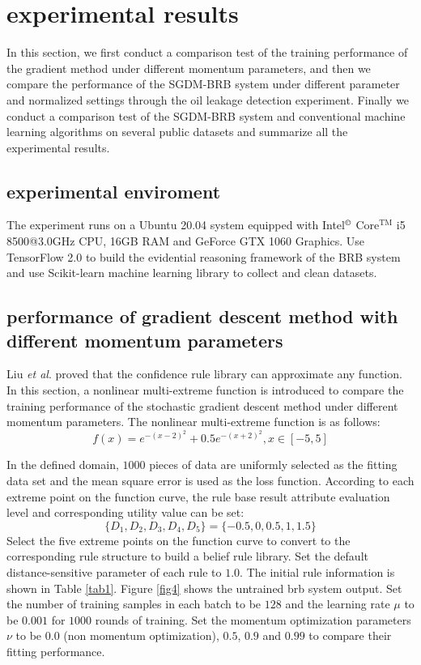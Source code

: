 \documentclass{ieeeaccess}
\begin{document}
\section{experimental results}
In this section, we first conduct a comparison test of the training performance of the gradient method under different momentum parameters,
and then we compare the performance of the SGDM-BRB system under different parameter and normalized settings through the oil leakage detection experiment.
Finally we conduct a comparison test of the SGDM-BRB system and conventional machine learning algorithms on several public datasets and summarize all the experimental results.

\subsection{experimental enviroment}
The experiment runs on a Ubuntu 20.04 system equipped with Intel$^{\copyright}$ Core$^{\text{TM}}$ i5 8500@3.0GHz CPU, 16GB RAM and GeForce GTX 1060 Graphics.
Use TensorFlow 2.0 to build the evidential reasoning framework of the BRB system and use Scikit-learn machine learning library to collect and clean datasets.

\subsection{performance of gradient descent method with different momentum parameters}
Liu \textit{et al}.\cite{a16} proved that the confidence rule library can approximate any function.
In this section, a nonlinear multi-extreme function is introduced to compare the training performance of the stochastic gradient descent method under different momentum parameters.
The nonlinear multi-extreme function is as follows:
\begin{equation}
    f(x)=e^{-(x-2)^2}+0.5e^{-(x+2)^2},x\in[-5,5]
\end{equation}

In the defined domain, $1000$ pieces of data are uniformly selected as the fitting data set and the mean square error is used as the loss function.
According to each extreme point on the function curve, the rule base result attribute evaluation level and corresponding utility value can be set:
$$\{D_1,D_2,D_3,D_4,D_5\}=\{-0.5,0,0.5,1,1.5\}$$
Select the five extreme points on the function curve to convert to the corresponding rule structure to build a belief rule library.
Set the default distance-sensitive parameter of each rule to $1.0$.
The initial rule information is shown in Table \ref{tab1}. Figure \ref{fig4} shows the untrained brb system output.
Set the number of training samples in each batch to be $128$ and the learning rate $\mu$ to be $0.001$ for $1000$ rounds of training.
Set the momentum optimization parameters $\nu$ to be 0.0 (non momentum optimization), $0.5$, $0.9$ and $0.99$ to compare their fitting performance.
\end{document}
